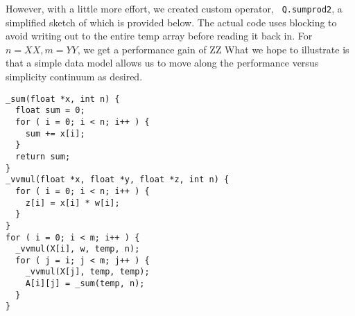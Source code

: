 However, with a little more effort, we created custom operator, {\tt
Q.sumprod2}, a simplified sketch of which is provided below. The actual code
uses blocking to avoid writing out to the entire temp array before reading it
back in.
For \(n = XX, m =
YY\), we get a performance gain of ZZ \TBC What we hope to illustrate is that a
simple data model allows us to move along the performance versus simplicity
continuum as desired.
\begin{verbatim}
_sum(float *x, int n) {
  float sum = 0;
  for ( i = 0; i < n; i++ ) { 
    sum += x[i];
  }
  return sum;
}
_vvmul(float *x, float *y, float *z, int n) {
  for ( i = 0; i < n; i++ ) { 
    z[i] = x[i] * w[i];
  }
}
for ( i = 0; i < m; i++ ) { 
  _vvmul(X[i], w, temp, n);
  for ( j = i; j < m; j++ ) { 
    _vvmul(X[j], temp, temp);
    A[i][j] = _sum(temp, n);
  }
}
\end{verbatim}

